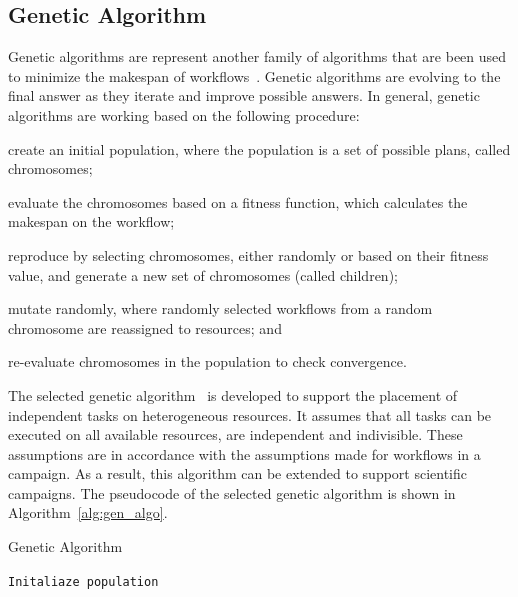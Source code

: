    
\subsection{Genetic Algorithm}
\label{algo:gen}
Genetic algorithms are represent another family of algorithms that are been used to minimize the makespan of workflows~\cite{dong2006scheduling}.
Genetic algorithms are evolving to the final answer as they iterate and improve possible answers.
In general, genetic algorithms are working based on the following procedure:
\begin{inparaenum}[(i)]
    \item create an initial population, where the population is a set of possible plans, called chromosomes;
    \item evaluate the chromosomes based on a fitness function, which calculates the makespan on the workflow;
    \item reproduce by selecting chromosomes, either randomly or based on their fitness value, and generate a new set of chromosomes (called children);
    \item mutate randomly, where randomly selected workflows from a random chromosome are reassigned to resources; and
    \item re-evaluate chromosomes in the population to check convergence.
\end{inparaenum}

The selected genetic algorithm~\cite{page2005algorithm} is developed to support the placement of independent tasks on heterogeneous resources.
It assumes that all tasks can be executed on all available resources, are independent and indivisible.
These assumptions are in accordance with the assumptions made for workflows in a campaign.
As a result, this algorithm can be extended to support scientific campaigns.
The pseudocode of the selected genetic algorithm is shown in Algorithm~\ref{alg:gen_algo}.

\begin{algorithm}[ht]
    \caption{Genetic Algorithm}
    \label{alg:gen_algo}
    \begin{algorithmic}[1]
        \State \texttt{Initaliaze population}
        \EndWhile
        \EndProcedure
    \end{algorithmic}
\end{algorithm}

